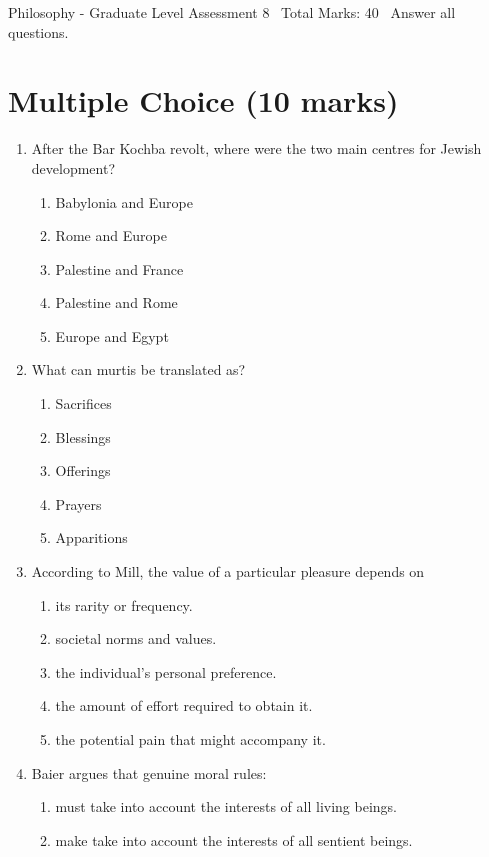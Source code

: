\documentclass[12pt]{article}
\begin{document}
\begin{center}
Philosophy - Graduate Level Assessment 8 \
Total Marks: 40 \
Answer all questions.
\end{center}

\section*{Multiple Choice (10 marks)}
\begin{enumerate}[label=\arabic*.]
\item After the Bar Kochba revolt, where were the two main centres for Jewish development?
\begin{enumerate}[label=(\alph*)]
    \item Babylonia and Europe
    \item Rome and Europe
    \item Palestine and France
    \item Palestine and Rome
    \item Europe and Egypt
\end{enumerate}
\item What can murtis be translated as?
\begin{enumerate}[label=(\alph*)]
    \item Sacrifices
    \item Blessings
    \item Offerings
    \item Prayers
    \item Apparitions
\end{enumerate}
\item According to Mill, the value of a particular pleasure depends on
\begin{enumerate}[label=(\alph*)]
    \item its rarity or frequency.
    \item societal norms and values.
    \item the individual's personal preference.
    \item the amount of effort required to obtain it.
    \item the potential pain that might accompany it.
\end{enumerate}
\item Baier argues that genuine moral rules:
\begin{enumerate}[label=(\alph*)]
    \item must take into account the interests of all living beings.
    \item make take into account the interests of all sentient beings.

\end{enumerate}
\end{enumerate}
\end{document}
